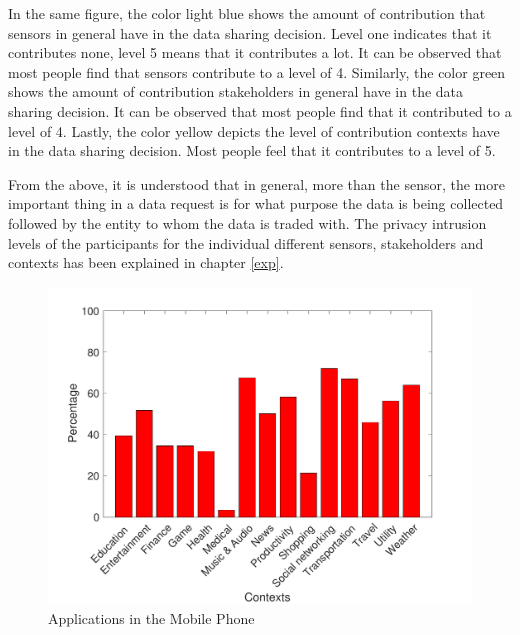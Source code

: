 In the same figure, the color light blue shows the amount of contribution that sensors in general have in the data sharing decision. Level one indicates that it contributes none, level 5 means that it contributes a lot. It can be observed that most people find that sensors contribute to a level of 4. Similarly, the color green shows the amount of contribution stakeholders in general have in the data sharing decision. It can be observed that most people find that it contributed to a level of 4. Lastly, the color yellow depicts the level of contribution contexts have in the data sharing decision. Most people feel that it contributes to a level of 5.

From the above, it is understood that in general, more than the sensor, the more important thing in a data request is for what purpose the data is being collected followed by the entity to whom the data is traded with. The privacy intrusion levels of the participants for the individual different sensors, stakeholders and contexts has been explained in chapter \ref{exp}.

\begin{figure}[ht!]
\centering
\includegraphics[width=\textwidth,keepaspectratio]{./images/pre_q6}
\caption{Applications in the Mobile Phone}
\label{fig:pre_q6}
\end{figure}

